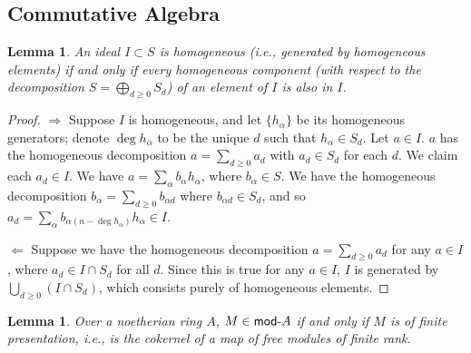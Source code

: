\documentclass[10pt]{article}
\newtheorem{lemma}[subsubsection]{Lemma}
\theoremstyle{definition}
\theoremstyle{remark}
\numberwithin{equation}{section}
\numberwithin{figure}{subsubsection}
\newcommand{\Mod}{\mathsf{mod}\mathchar`-}
\begin{document}
\subsection{Commutative Algebra}
\begin{lemma}\label{homoglem}
  An ideal $I \subset S$ is homogeneous (i.e., generated by homogeneous elements) if and only if every homogeneous component (with respect to the decomposition $S = \bigoplus_{d \ge 0} S_d$) of an element of $I$ is also in $I$.
\end{lemma}
\begin{proof}
  $\Rightarrow$ Suppose $I$ is homogeneous, and let $\{h_\alpha\}$ be its homogeneous generators; denote $\deg h_\alpha$ to be the unique $d$ such that $h_\alpha \in S_d$. Let $a \in I$. $a$ has the homogeneous decomposition $a = \sum_{d \ge 0} a_d$ with $a_d \in S_d$ for each $d$. We claim each $a_d \in I$. We have $a = \sum_\alpha b_\alpha h_\alpha$, where $b_\alpha \in S$. We have the homogeneous decomposition $b_\alpha = \sum_{d \ge 0} b_{\alpha d}$ where $b_{\alpha d} \in S_d$, and so $a_d = \sum_\alpha b_{\alpha(n - \deg h_\alpha)}h_\alpha \in I$.
  \par $\Leftarrow$ Suppose we have the homogeneous decomposition $a = \sum_{d \ge 0} a_d$ for any $a \in I$, where $a_d \in I \cap S_d$ for all $d$. Since this is true for any $a \in I$, $I$ is generated by $\bigcup_{d \ge 0} (I \cap S_d)$, which consists purely of homogeneous elements.
\end{proof}
\begin{lemma}\label{noethfpfg}
  Over a noetherian ring $A$, $M \in \Mod A$ if and only if $M$ is of finite presentation, i.e., is the cokernel of a map of free modules of finite rank.
\end{lemma}
\end{document}
